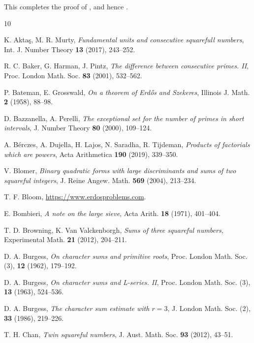\documentclass[12pt]{amsart}
\begin{document}
This completes the proof of , and hence .





\begin{thebibliography}{10}

K. Akta\c{s}, M. R. Murty, \emph{Fundamental units and consecutive squarefull numbers}, Int. J. Number Theory \textbf{13} (2017), 243--252.

R. C. Baker, G. Harman, J. Pintz, \emph{The difference between consecutive primes. II}, Proc. London Math. Soc. \textbf{83} (2001), 532--562.

P. Bateman, E. Grosswald, \emph{On a theorem of Erd\H{o}s and Szekeres}, Illinois J. Math. \textbf{2} (1958), 88--98.

D. Bazzanella, A. Perelli, \emph{The exceptional set for the number of primes in short intervals}, J. Number
Theory \textbf{80} (2000), 109--124.

A. B\'erczes, A. Dujella, H. Lajos, N. Saradha, R. Tijdeman, \emph{Products of factorials which are powers}, Acta Arithmetica \textbf{190} (2019), 339--350.

V. Blomer, \emph{Binary quadratic forms with large discriminants and sums of two squareful integers}, J. Reine Angew. Math. \textbf{569} (2004), 213--234.

T. F. Bloom, \url{https://www.erdosproblems.com}.

E. Bombieri, \emph{A note on the large sieve}, Acta Arith. \textbf{18} (1971), 401--404.

T. D. Browning, K. Van Valckenborgh, \emph{Sums of three squareful numbers}, Experimental Math. \textbf{21} (2012), 204--211.

D. A. Burgess, \emph{On character sums and primitive roots}, Proc. London
Math. Soc. (3), \textbf{12} (1962), 179--192.

D. A. Burgess, \emph{On character sums and L-series. II}, Proc. London Math.
Soc. (3), \textbf{13} (1963), 524--536.

D. A. Burgess, \emph{The character sum estimate with $r = 3$}, J. London Math.
Soc. (2), \textbf{33} (1986), 219--226.

T. H. Chan, \emph{Twin squareful numbers}, J. Aust. Math. Soc. \textbf{93} (2012), 43--51.


\end{thebibliography}
\end{document}
